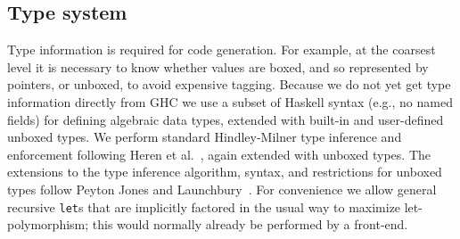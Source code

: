 \documentclass{llncs}
\begin{document}
\begin{comment}
For \emph{direct calls}, in which a known function is applied
to a number of arguments equal to its arity, \emph{stgApply} need not be
invoked: the \emph{FUN} is tail-called directly.


In addition to being in a tail call position, the GCC constraints for
generating a tail call (jump) are (approximately) that the total size of the
caller and callee arguments be equal, and the return type sizes be equal.  For
Clang the requirement is slightly more strict: caller and callee type
signatures must be the same.  These are a consequence of the C calling
convention that the caller, not callee, cleans up the stack (removes the
callee's stack frame).  However, because we maintain our own stack we can
define our own calling convention(s), so tail calls can be made to functions
of notionally differing type.  In particular, top-of-stack frames can be
adjusted in size and content without undue copying.
\end{comment}

\subsection{Type system}

Type information is required for code generation.  For example, at the
coarsest level it is necessary to know whether values are boxed, and so
represented by pointers, or unboxed, to avoid expensive tagging.  Because we
do not yet get type information directly from GHC we use a subset of Haskell
syntax (e.g., no named fields) for defining algebraic data types, extended
with built-in and user-defined unboxed types.  We perform standard
Hindley-Milner type inference and enforcement following Heren et
al.~\cite{Heren02}, again extended with unboxed types.  The extensions to the
type inference algorithm, syntax, and restrictions for unboxed types follow
Peyton Jones and Launchbury~\cite{Jones:1991}.
For convenience we allow general recursive \texttt{let}s that are implicitly
factored in the usual way to maximize let-polymorphism; this would normally
already be performed by a front-end.
\begin{comment}
 breaks the page limit
One would expect an automated STG generator such as GHC to factor recursive
\texttt{let} expressions into nested recursive and non-recursive \texttt{let}s
in the usual way to maximize let-polymorphism.  Because our STG is intended
to be somewhat convenient to write by hand we relax this constraint and perform
this transformation implicitly using a strongly-connected components algorithm
inspired by King and Launchbury~\cite{King:1995}.
\end{comment}
\end{document}

